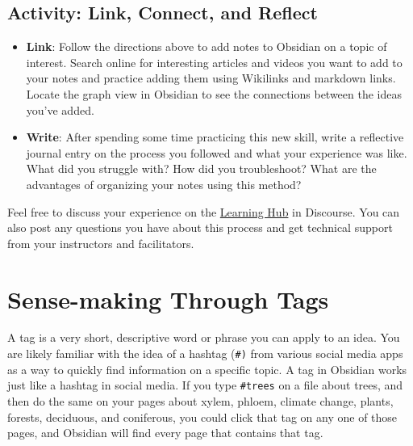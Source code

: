 \documentclass[
  letterpaper,
  DIV=11,
  numbers=noendperiod]{scrreprt}
\begin{document}
\subsection{Activity: Link, Connect, and
Reflect}\label{activity-link-connect-and-reflect}

\begin{tcolorbox}[enhanced jigsaw, toprule=.15mm, colback=white, colframe=quarto-callout-note-color-frame, bottomtitle=1mm, leftrule=.75mm, coltitle=black, titlerule=0mm, rightrule=.15mm, colbacktitle=quarto-callout-note-color!10!white, left=2mm, title={Learning Activity}, opacitybacktitle=0.6, opacityback=0, breakable, toptitle=1mm, arc=.35mm, bottomrule=.15mm]

\begin{itemize}
\item
  \textbf{Link}: Follow the directions above to add notes to Obsidian on
  a topic of interest. Search online for interesting articles and videos
  you want to add to your notes and practice adding them using Wikilinks
  and markdown links. Locate the graph view in Obsidian to see the
  connections between the ideas you've added.
\item
  \textbf{Write}: After spending some time practicing this new skill,
  write a reflective journal entry on the process you followed and what
  your experience was like. What did you struggle with? How did you
  troubleshoot? What are the advantages of organizing your notes using
  this method?
\end{itemize}

Feel free to discuss your experience on the
\href{https://twu.discourse.group/auth/microsoft_office365}{Learning
Hub} in Discourse. You can also post any questions you have about this
process and get technical support from your instructors and
facilitators.

\end{tcolorbox}

\section{Sense-making Through Tags}\label{sense-making-through-tags}

A tag is a very short, descriptive word or phrase you can apply to an
idea. You are likely familiar with the idea of a hashtag
(\texttt{\#\textasciigrave{}\textasciigrave{})} from various social
media apps as a way to quickly find information on a specific topic. A
tag in Obsidian works just like a hashtag in social media. If you type
\texttt{\#trees} on a file about trees, and then do the same on your
pages about xylem, phloem, climate change, plants, forests, deciduous,
and coniferous, you could click that tag on any one of those pages, and
Obsidian will find every page that contains that tag.
\end{document}
